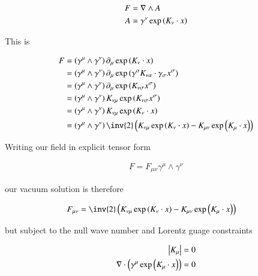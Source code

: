 \documentclass{article}
\begin{document}
\begin{align*}
F &= \nabla \wedge A \\
A &= \gamma^\nu \exp\left( K_\nu \cdot x \right)  \\
\end{align*}

This is

\begin{align*}
F 
&= \left(\gamma^\mu \wedge \gamma^\nu\right) \partial_\mu \exp\left( K_\nu \cdot x \right) \\
&= \left(\gamma^\mu \wedge \gamma^\nu\right) \partial_\mu \exp\left( \gamma^\alpha K_{\nu\alpha} \cdot \gamma_\sigma x^\sigma \right) \\
&= \left(\gamma^\mu \wedge \gamma^\nu\right) \partial_\mu \exp\left( K_{\nu\sigma} x^\sigma \right) \\
&= \left(\gamma^\mu \wedge \gamma^\nu\right) K_{\nu\mu} \exp\left( K_{\nu\sigma} x^\sigma \right) \\
&= \left(\gamma^\mu \wedge \gamma^\nu\right) K_{\nu\mu} \exp\left( K_{\nu} \cdot x \right) \\
&= \left(\gamma^\mu \wedge \gamma^\nu\right) 
\inv{2} \left( K_{\nu\mu} \exp\left( K_{\nu} \cdot x \right) - K_{\mu\nu} \exp\left( K_{\mu} \cdot x \right) \right) \\
\end{align*}

Writing our field in explicit tensor form

\begin{align*}
F = F_{\mu\nu} \gamma^\mu \wedge \gamma^\nu
\end{align*}

our vacuum solution is therefore

\begin{align}
F_{\mu\nu} &= \inv{2} \left( K_{\nu\mu} \exp\left( K_{\nu} \cdot x \right) - K_{\mu\nu} \exp\left( K_{\mu} \cdot x \right) \right) 
\end{align}

but subject to the null wave number and Lorentz guage constraints

\begin{align}
\left\lvert{K_\mu}\right\rvert &= 0 \\
\nabla \cdot \left(\gamma^\mu \exp\left( K_\mu \cdot x \right)\right) &= 0
\end{align}
\end{document}

